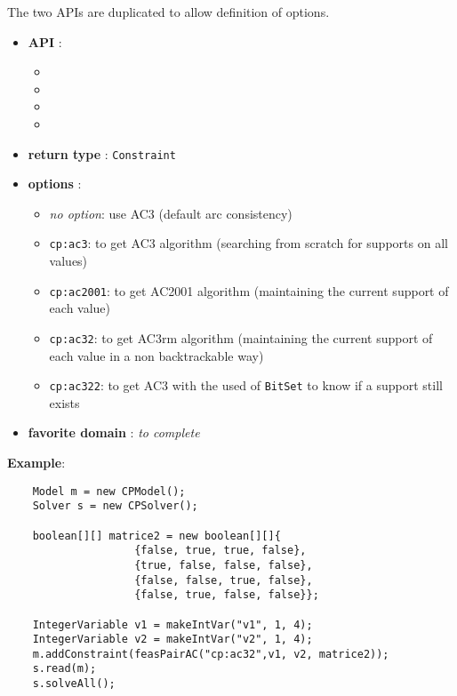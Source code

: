 The two APIs are duplicated to allow definition of options.
\begin{itemize}
	\item \textbf{API} :
	\begin{itemize}
		\item {}
		\item {}
		\item {}
		\item {}
	\end{itemize}
	\item \textbf{return type} : \texttt{Constraint}
	\item \textbf{options} :
	\begin{itemize}
		\item \emph{no option}: use AC3 (default arc consistency)
		\item \texttt{cp:ac3}: to get AC3 algorithm (searching from scratch for supports on all values)
		\item \texttt{cp:ac2001}: to get AC2001 algorithm (maintaining the current support of each value)
		\item \texttt{cp:ac32}: to get AC3rm algorithm (maintaining the current support of each value in a non backtrackable way)
		\item \texttt{cp:ac322}: to get AC3 with the used of \texttt{BitSet} to know if a support still exists
	\end{itemize}
	\item \textbf{favorite domain} : \emph{to complete}
\end{itemize}

\textbf{Example}:
\begin{lstlisting}
	Model m = new CPModel();
	Solver s = new CPSolver();
	
	boolean[][] matrice2 = new boolean[][]{
	                {false, true, true, false},
	                {true, false, false, false},
	                {false, false, true, false},
	                {false, true, false, false}};
	
	IntegerVariable v1 = makeIntVar("v1", 1, 4);
	IntegerVariable v2 = makeIntVar("v2", 1, 4);
	m.addConstraint(feasPairAC("cp:ac32",v1, v2, matrice2));
	s.read(m);
	s.solveAll();
\end{lstlisting} 
